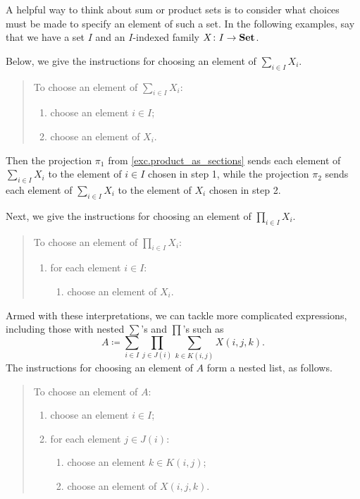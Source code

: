 \documentclass[Book-Poly]{subfiles}
\begin{document}
A helpful way to think about sum or product sets is to consider what choices must be made to specify an element of such a set.
In the following examples, say that we have a set $I$ and an $I$-indexed family $X \colon I \to \mathbf{Set}$.

Below, we give the instructions for choosing an element of $\sum_{i \in I} X_i$.

\begin{quote}
    To choose an element of $\sum_{i \in I} X_i$:
    \begin{enumerate}
        \item choose an element $i \in I$;
        \item choose an element of $X_i$.
    \end{enumerate}
\end{quote}

Then the projection $\pi_1$ from \cref{exc.product_as_sections} sends each element of $\sum_{i \in I} X_i$ to the element of $i \in I$ chosen in step 1, while the projection $\pi_2$ sends each element of $\sum_{i \in I} X_i$ to the element of $X_i$ chosen in step 2.

Next, we give the instructions for choosing an element of $\prod_{i \in I} X_i$.

\begin{quote}
    To choose an element of $\prod_{i \in I} X_i$:
    \begin{enumerate}
        \item for each element $i \in I$:
        \begin{enumerate}[label*=\arabic*.]
            \item choose an element of $X_i$.
        \end{enumerate}
    \end{enumerate}
\end{quote}

Armed with these interpretations, we can tackle more complicated expressions, including those with nested $\sum$'s and $\prod$'s such as
\begin{equation}\label{eqn.sum_prod_sum}
    A \coloneqq \sum_{i\in I}\prod_{j\in J(i)}\sum_{k\in K(i,j)}X(i,j,k).
\end{equation}
The instructions for choosing an element of $A$ form a nested list, as follows.

\begin{quote}
    To choose an element of $A$:
    \begin{enumerate}
        \item choose an element $i \in I$;
        \item for each element $j \in J(i)$:
        \begin{enumerate}[label*=\arabic*.]
            \item choose an element $k \in K(i,j)$;
            \item choose an element of $X(i,j,k)$.
        \end{enumerate}
    \end{enumerate}
\end{quote}
\end{document}
